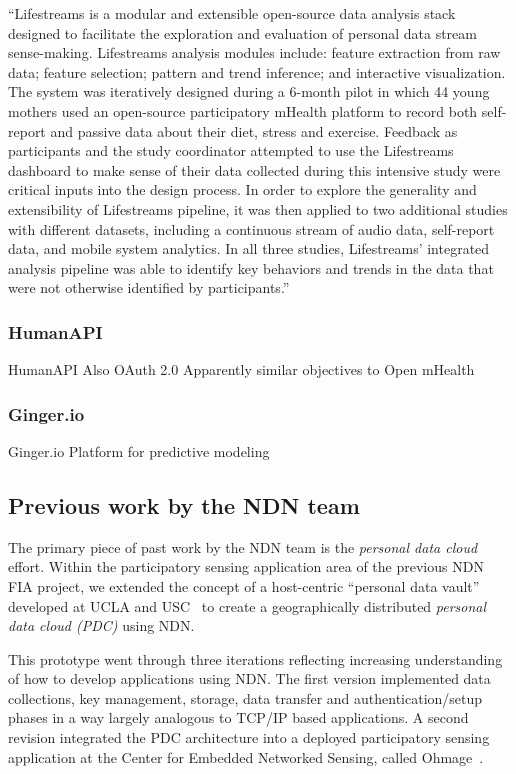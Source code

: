 ``Lifestreams is a modular and extensible open-source data analysis stack designed to facilitate the exploration and evaluation of personal data stream sense-making. Lifestreams analysis modules include: feature extraction from raw data; feature selection; pattern and trend inference; and interactive visualization. The system was iteratively designed during a 6-month pilot in which 44 young mothers used an open-source participatory mHealth platform to record both self-report and passive data about their diet, stress and exercise. Feedback as participants and the study coordinator attempted to use the Lifestreams dashboard to make sense of their data collected during this intensive study were critical inputs into the design process. In order to explore the generality and extensibility of Lifestreams pipeline, it was then applied to two additional studies with different datasets, including a continuous stream of audio data, self-report data, and mobile system analytics. In all three studies, Lifestreams' integrated analysis pipeline was able to identify key behaviors and trends in the data that were not otherwise identified by participants.''
\cite{hsieh2013lifestreams}


\subsubsection{HumanAPI}

HumanAPI
Also OAuth 2.0
Apparently similar objectives to Open mHealth

\subsubsection{Ginger.io}
Ginger.io
Platform for predictive modeling

\subsection{Previous work by the NDN team}

The primary piece of past work by the NDN team is the \emph{personal data cloud} effort. 
Within the participatory sensing application area of the previous NDN
FIA project, we extended the concept of a host-centric ``personal data
vault'' developed at UCLA and USC~\cite{mun2010personal} to create a
geographically distributed \emph{personal data cloud (PDC)} using NDN.

This prototype went through three iterations reflecting increasing
understanding of how to develop applications using NDN.   The first
version implemented data collections, key management, storage, data
transfer and authentication/setup phases in a way largely analogous to
TCP/IP based applications.  A second revision integrated the PDC
architecture into a deployed participatory sensing application at the
Center for Embedded Networked Sensing, called
Ohmage~\cite{ramanathan2012ohmage}.


